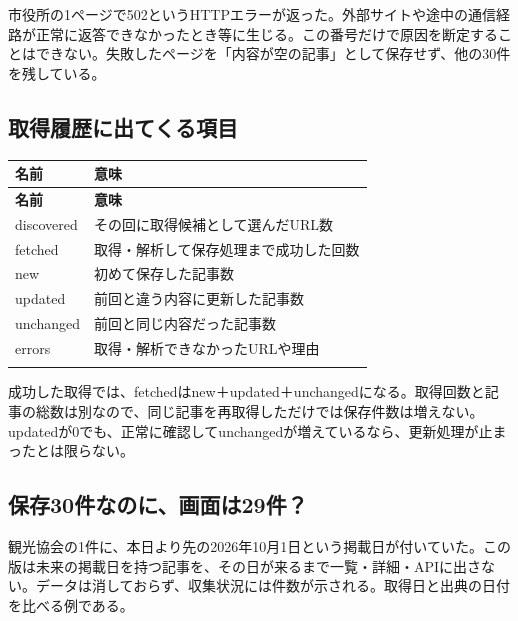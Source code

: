 \documentclass[a4paper,10pt]{ltjsarticle}
\begin{document}
市役所の1ページで502というHTTPエラーが返った。外部サイトや途中の通信経路が正常に返答できなかったとき等に生じる。この番号だけで原因を断定することはできない。失敗したページを「内容が空の記事」として保存せず、他の30件を残している。


\subsection*{取得履歴に出てくる項目}

{\small\begin{longtable}{@{}>{\raggedright\arraybackslash}p{}>{\raggedright\arraybackslash}p{}@{}}

\rowcolor{Pale}\textbf{名前} & \textbf{意味} \\ \midrule

\endfirsthead

\rowcolor{Pale}\textbf{名前} & \textbf{意味} \\ \midrule\endhead

discovered & その回に取得候補として選んだURL数 \\ \addlinespace[3pt]

fetched & 取得・解析して保存処理まで成功した回数 \\ \addlinespace[3pt]

new & 初めて保存した記事数 \\ \addlinespace[3pt]

updated & 前回と違う内容に更新した記事数 \\ \addlinespace[3pt]

unchanged & 前回と同じ内容だった記事数 \\ \addlinespace[3pt]

errors & 取得・解析できなかったURLや理由 \\ \addlinespace[3pt]

\bottomrule\end{longtable}}

成功した取得では、fetchedはnew＋updated＋unchangedになる。取得回数と記事の総数は別なので、同じ記事を再取得しただけでは保存件数は増えない。updatedが0でも、正常に確認してunchangedが増えているなら、更新処理が止まったとは限らない。


\subsection*{保存30件なのに、画面は29件？}

観光協会の1件に、本日より先の2026年10月1日という掲載日が付いていた。この版は未来の掲載日を持つ記事を、その日が来るまで一覧・詳細・APIに出さない。データは消しておらず、収集状況には件数が示される。取得日と出典の日付を比べる例である。
\end{document}
